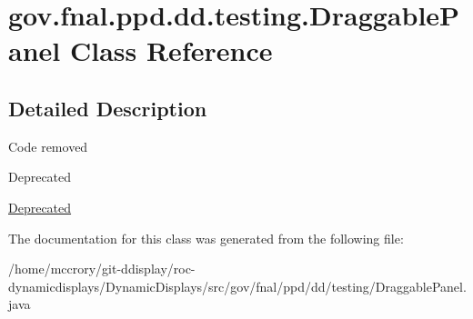 \hypertarget{classgov_1_1fnal_1_1ppd_1_1dd_1_1testing_1_1DraggablePanel}{\section{gov.\-fnal.\-ppd.\-dd.\-testing.\-Draggable\-Panel Class Reference}
\label{classgov_1_1fnal_1_1ppd_1_1dd_1_1testing_1_1DraggablePanel}
}


\subsection{Detailed Description}
Code removed \begin{DoxyRefDesc}{Deprecated}
\item[\hyperlink{deprecated__deprecated000005}{Deprecated}]\end{DoxyRefDesc}


The documentation for this class was generated from the following file\-:\begin{DoxyCompactItemize}
\item 
/home/mccrory/git-\/ddisplay/roc-\/dynamicdisplays/\-Dynamic\-Displays/src/gov/fnal/ppd/dd/testing/Draggable\-Panel.\-java\end{DoxyCompactItemize}
